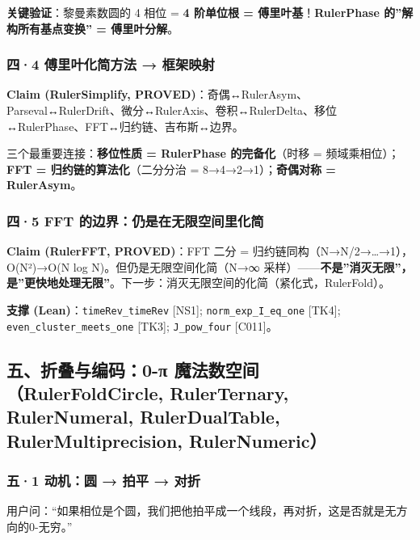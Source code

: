 \documentclass[
]{article}
\begin{document}
\textbf{关键验证}：黎曼素数圆的 4 相位 = \textbf{4 阶单位根 =
傅里叶基}！\textbf{RulerPhase 的''解构所有基点变换'' = 傅里叶分解}。

\subsubsection{四·4 傅里叶化简方法 →
框架映射}\label{ux56db4-ux5085ux91ccux53f6ux5316ux7b80ux65b9ux6cd5-ux6846ux67b6ux6620ux5c04}

\textbf{Claim (RulerSimplify,
PROVED)}：奇偶↔RulerAsym、Parseval↔RulerDrift、微分↔RulerAxis、卷积↔RulerDelta、移位↔RulerPhase、FFT↔归约链、吉布斯↔边界。

三个最重要连接：\textbf{移位性质 = RulerPhase 的完备化}（时移 =
频域乘相位）；\textbf{FFT = 归约链的算法化}（二分分治 =
8→4→2→1）；\textbf{奇偶对称 = RulerAsym}。

\subsubsection{四·5 FFT
的边界：仍是在无限空间里化简}\label{ux56db5-fft-ux7684ux8fb9ux754cux4ecdux662fux5728ux65e0ux9650ux7a7aux95f4ux91ccux5316ux7b80}

\textbf{Claim (RulerFFT, PROVED)}：FFT 二分 =
归约链同构（N→N/2→\ldots→1），O(N²)→O(N log N)。但仍是无限空间化简（N→∞
采样）------\textbf{不是''消灭无限''，是''更快地处理无限''}。下一步：消灭无限空间的化简（紧化式，RulerFold）。

\textbf{支撑 (Lean)}：\texttt{timeRev\_timeRev} {[}NS1{]};
\texttt{norm\_exp\_I\_eq\_one} {[}TK4{]};
\texttt{even\_cluster\_meets\_one} {[}TK3{]}; \texttt{J\_pow\_four}
{[}C011{]}。

\subsection{五、折叠与编码：0-π 魔法数空间（RulerFoldCircle,
RulerTernary, RulerNumeral, RulerDualTable, RulerMultiprecision,
RulerNumeric）}\label{ux4e94ux6298ux53e0ux4e0eux7f16ux78010-ux3c0-ux9b54ux6cd5ux6570ux7a7aux95f4rulerfoldcircle-rulerternary-rulernumeral-rulerdualtable-rulermultiprecision-rulernumeric}

\subsubsection{五·1 动机：圆 → 拍平 →
对折}\label{ux4e941-ux52a8ux673aux5706-ux62cdux5e73-ux5bf9ux6298}

用户问：``如果相位是个圆，我们把他拍平成一个线段，再对折，这是否就是无方向的0-无穷。''
\end{document}
